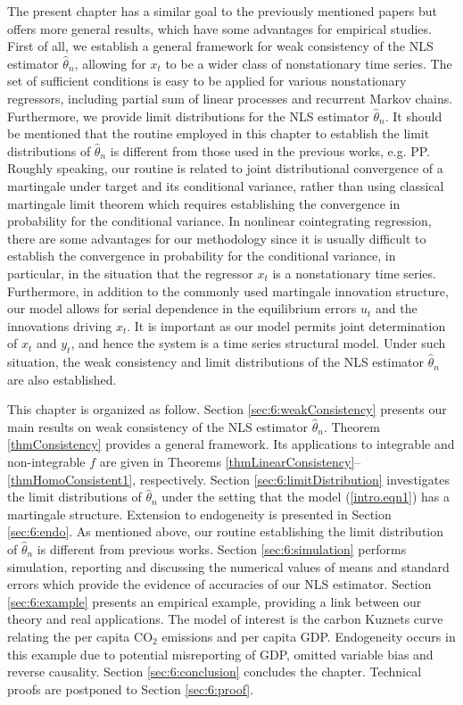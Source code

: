 The present chapter has a similar goal to the previously mentioned papers but offers more general results, which have some advantages for empirical studies. First of all, we establish a general framework for  weak consistency of the NLS estimator $\hat{\theta}_n$, allowing for $x_t$ to be  a  wider class of nonstationary time series.
 The set of sufficient conditions is easy to be applied for various nonstationary regressors, including partial sum of linear processes and recurrent Markov chains. Furthermore, we  provide limit distributions for the NLS estimator $\hat{\theta}_n$. It  should be mentioned that  the routine employed in this chapter to establish the limit distributions of $\hat\theta_n$ is different from those used in the previous works, e.g. PP. Roughly speaking, our routine is related to joint distributional convergence of a martingale under target and its conditional variance, rather than using classical martingale limit theorem which requires establishing the convergence in probability for the conditional variance.  In nonlinear cointegrating regression, there are   some advantages for our methodology  since it is usually difficult to establish the convergence in probability for the conditional variance, in particular, in the situation that the regressor $x_t$ is a nonstationary time series.
Furthermore, in addition to the commonly used martingale innovation structure, our model allows for serial dependence in the equilibrium errors $u_t$ and the innovations driving $x_t$. It is important as our model  permits joint determination of $x_t$ and $y_t$, and hence the system is a time series structural model. Under such situation, the weak consistency and limit distributions of the NLS estimator $\hat{\theta}_n$ are also established.

This chapter is organized as follow. Section \ref{sec:6:weakConsistency} presents our main results on weak consistency of the NLS estimator $\hat \theta_n$. Theorem \ref{thmConsistency} provides a general framework.  Its applications to integrable and non-integrable $f$  are given in Theorems \ref{thmLinearConsistency}--\ref{thmHomoConsistent1}, respectively.  Section \ref{sec:6:limitDistribution} investigates the limit distributions of $\hat \theta_n$ under the setting that the model (\ref {intro.eqn1}) has a martingale structure. Extension to endogeneity is presented in Section \ref{sec:6:endo}. As mentioned above, 
our routine establishing the limit distribution of $\hat \theta_n$ is different from previous works. Section \ref{sec:6:simulation} performs simulation,  reporting and discussing the numerical values of means and standard errors which provide the evidence of accuracies of our NLS estimator. Section \ref{sec:6:example} presents  an empirical example,  providing a link between our theory and real applications. The model of interest is the carbon Kuznets curve relating the per capita CO$_2$ emissions and per capita GDP. Endogeneity occurs in this example due to potential misreporting of GDP, omitted variable bias and reverse causality. Section \ref{sec:6:conclusion} concludes the chapter. Technical proofs are postponed to Section \ref{sec:6:proof}.

